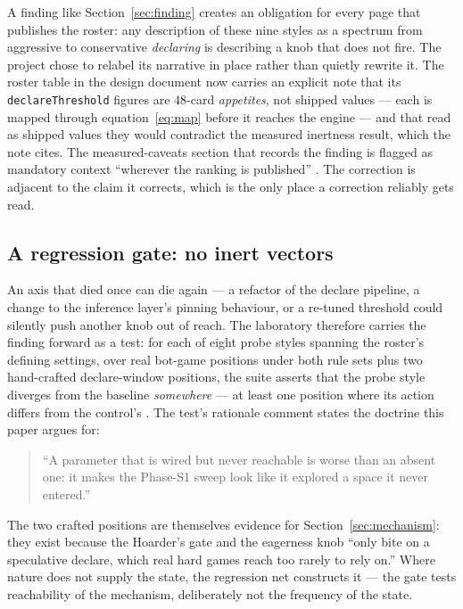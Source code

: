 \documentclass[11pt]{article}
\newcommand{\code}[1]{\texttt{#1}}
\begin{document}
A finding like Section~\ref{sec:finding} creates an obligation for every page that publishes the
roster: any description of these nine styles as a spectrum from aggressive to conservative
\emph{declaring} is describing a knob that does not fire. The project chose to relabel its
narrative in place rather than quietly rewrite it. The roster table in the design document now
carries an explicit note that its \code{declareThreshold} figures are 48-card \emph{appetites},
not shipped values --- each is mapped through equation~\eqref{eq:map} before it reaches the
engine --- and that read as shipped values they would contradict the measured inertness result,
which the note cites. The measured-caveats section that records the finding is flagged as
mandatory context ``wherever the ranking is published'' \cite{styles}. The correction is
adjacent to the claim it corrects, which is the only place a correction reliably gets read.

\subsection{A regression gate: no inert vectors}
\label{sec:gate}

An axis that died once can die again --- a refactor of the declare pipeline, a change to the
inference layer's pinning behaviour, or a re-tuned threshold could silently push another knob out
of reach. The laboratory therefore carries the finding forward as a test: for each of eight
probe styles spanning the roster's defining settings, over real bot-game positions under both
rule sets plus two hand-crafted declare-window positions, the suite asserts that the probe style
diverges from the baseline \emph{somewhere} --- at least one position where its action differs
from the control's \cite{styletest}. The test's rationale comment states the doctrine this paper
argues for:

\begin{quote}
``A parameter that is wired but never reachable is worse than an absent one: it makes the
Phase-S1 sweep look like it explored a space it never entered.''
\end{quote}

The two crafted positions are themselves evidence for Section~\ref{sec:mechanism}: they exist
because the Hoarder's gate and the eagerness knob ``only bite on a speculative declare, which
real hard games reach too rarely to rely on.'' Where nature does not supply the state, the
regression net constructs it --- the gate tests reachability of the mechanism, deliberately not
the frequency of the state.
\end{document}
